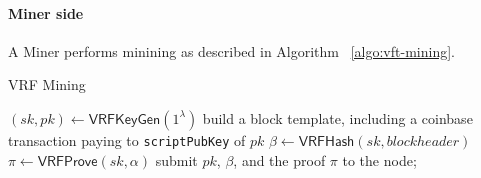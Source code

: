 
\paragraph{Miner side}
\newblock
\newline
A Miner performs minining as described in Algorithm ~\ref{algo:vft-mining}.
\begin{algorithm}[H]
\caption{VRF Mining}
\label{algo:vft-mining}
\SetAlgoLined
  $(sk, pk) \gets \mathsf{VRFKeyGen}(1^{\lambda})$\;
  build a block template, including a coinbase transaction paying to \texttt{scriptPubKey} of $pk$\;
  $\beta \gets \mathsf{VRFHash}(sk, blockheader)$\;
  $\pi \gets \mathsf{VRFProve}(sk, \alpha)$\;
  submit $pk$, $\beta$, and the proof $\pi$ to the node;
\end{algorithm}

